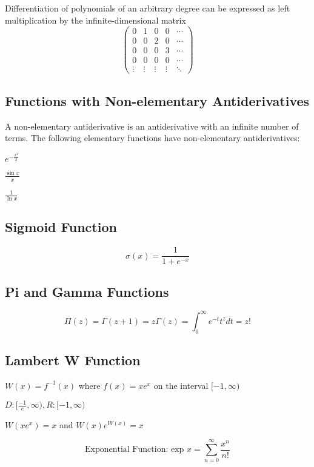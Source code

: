 	Differentiation of polynomials of an arbitrary degree can be expressed as left multiplication by the infinite-dimensional matrix $$\begin{pmatrix}
	0      & 1      & 0      & 0      & \cdots\\
	0      & 0      & 2      & 0      & \cdots\\
	0      & 0      & 0      & 3      & \cdots\\
	0      & 0      & 0      & 0      & \cdots\\
	\vdots & \vdots & \vdots & \vdots & \ddots

	\end{pmatrix}$$

	\subsection{Functions with Non-elementary Antiderivatives}

	A non-elementary antiderivative is an antiderivative with an infinite number of terms. The following elementary functions have non-elementary antiderivatives:

	$e^{-\frac{x^{2}}{2}}$

	$\frac{\sin{x}}{x}$

	$\frac{1}{\ln{x}}$

	\subsection{Sigmoid Function}

	$$\sigma (x) = \displaystyle{\frac{1}{1+e^{-x}}}$$

	\subsection{Pi and Gamma Functions}

	$$\Pi(z) = \Gamma(z + 1) = z\Gamma(z) = \displaystyle{\int_{0}^{\infty}e^{-t}t^{z}dt} = z!$$

	\subsection{Lambert W Function}

	$W(x) = f^{-1}(x)$ where $f(x) = xe^{x}$ on the interval $[-1, \infty )$

	$D:[\frac{-1}{e}, \infty), R:[-1, \infty )$

	$W(xe^{x}) = x$ and $W(x)e^{W(x)} = x$

	$$\text{Exponential Function: }\text{exp }x = \displaystyle{\sum_{n=0}^{\infty} \frac{x^{n}}{n!}}$$

